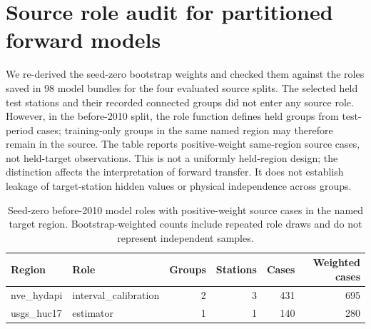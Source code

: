 \section{Source role audit for partitioned forward models}
We re-derived the seed-zero bootstrap weights and checked them against the roles saved in 98 model bundles for the four evaluated source splits. The selected held test stations and their recorded connected groups did not enter any source role. However, in the before-2010 split, the role function defines held groups from test-period cases; training-only groups in the same named region may therefore remain in the source. The table reports positive-weight same-region source cases, not held-target observations. This is not a uniformly held-region design; the distinction affects the interpretation of forward transfer. It does not establish leakage of target-station hidden values or physical independence across groups.
\begin{table}[p]\centering\small
\caption{Seed-zero before-2010 model roles with positive-weight source cases in the named target region. Bootstrap-weighted counts include repeated role draws and do not represent independent samples.}\label{tab:forward-region-role-audit}
\begin{tabular}{llrrrr}\toprule
Region & Role & Groups & Stations & Cases & Weighted cases\\\midrule
nve\_hydapi & interval\_calibration & 2 & 3 & 431 & 695\\
usgs\_huc17 & estimator & 1 & 1 & 140 & 280\\
\bottomrule\end{tabular}
\end{table}
